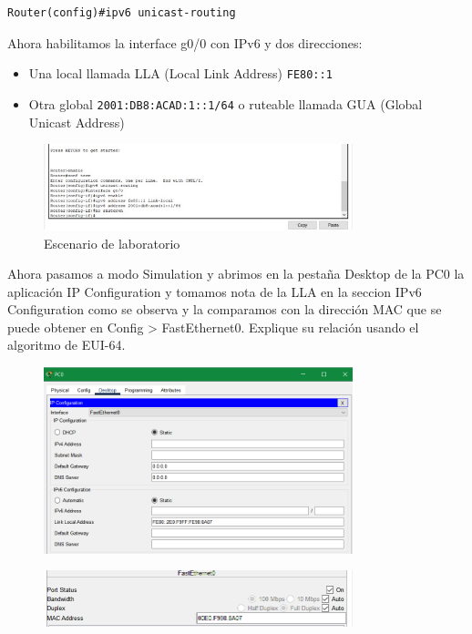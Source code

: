 \documentclass{article}
\begin{document}
\begin{lstlisting}
Router(config)#ipv6 unicast-routing
\end{lstlisting}

Ahora habilitamos la interface g0/0 con IPv6 y dos direcciones:
\begin{itemize}
    \item Una local llamada LLA (Local Link Address) \texttt{FE80::1}
    \item Otra global \texttt{2001:DB8:ACAD:1::1/64} o ruteable llamada GUA (Global Unicast Address)
\end{itemize}
\begin{figure}[h]
    \centering
    \includegraphics[width=0.8\textwidth]{imgcob2.png}
    \caption{Escenario de laboratorio}
\end{figure}

Ahora pasamos a modo Simulation y abrimos en la pestaña Desktop de la PC0 la aplicación IP Configuration y tomamos nota de la LLA en la seccion IPv6 Configuration como se observa y la comparamos con la dirección MAC que se puede obtener en Config > FastEthernet0. Explique su relación usando el algoritmo de EUI-64.

\begin{figure}[h]
    \centering
    \includegraphics[width=0.8\textwidth]{1.png}
\end{figure}
\begin{figure}[h]
    \centering
    \includegraphics[width=0.8\textwidth]{2.png}
\end{figure}
\end{document}

